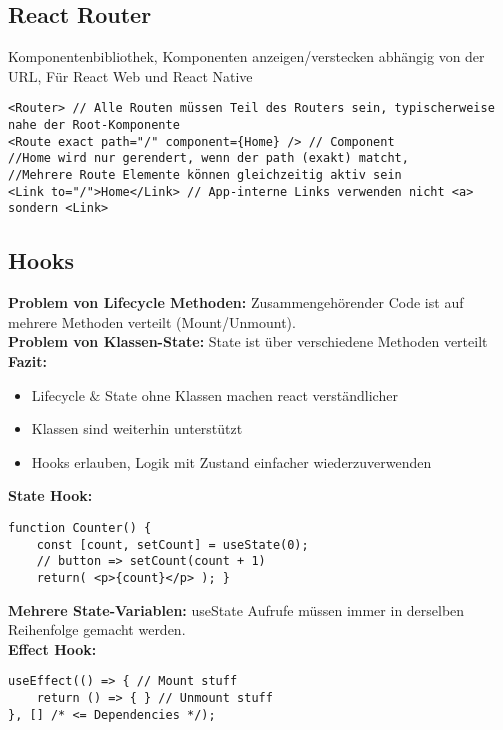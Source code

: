 \subsection{React Router}
Komponentenbibliothek, Komponenten anzeigen/verstecken abhängig von der URL, Für React Web und React Native
\begin{lstlisting}[style=htmlcssjs]
<Router> // Alle Routen müssen Teil des Routers sein, typischerweise nahe der Root-Komponente
<Route exact path="/" component={Home} /> // Component
//Home wird nur gerendert, wenn der path (exakt) matcht,
//Mehrere Route Elemente können gleichzeitig aktiv sein
<Link to="/">Home</Link> // App-interne Links verwenden nicht <a> sondern <Link>
\end{lstlisting}
\subsection{Hooks}
\textbf{Problem von Lifecycle Methoden:} Zusammengehörender Code ist auf mehrere Methoden verteilt (Mount/Unmount).\\
\textbf{Problem von Klassen-State:} State ist über verschiedene Methoden verteilt\\
\textbf{Fazit:}
\begin{itemize}[topsep=0pt, leftmargin=3mm]
  \setlength\itemsep{-0.3em}
  \item Lifecycle $\&$ State ohne Klassen machen react verständlicher
  \item Klassen sind weiterhin unterstützt
  \item Hooks erlauben, Logik mit Zustand einfacher wiederzuverwenden
\end{itemize}
\textcolor{b}{\textbf{State Hook:}}
\begin{lstlisting}[style=htmlcssjs]
function Counter() {
    const [count, setCount] = useState(0);
    // button => setCount(count + 1)
    return( <p>{count}</p> ); }
\end{lstlisting}
\textbf{Mehrere State-Variablen:} useState Aufrufe müssen immer in derselben Reihenfolge gemacht werden.\\
\textcolor{b}{\textbf{Effect Hook:}}
\begin{lstlisting}[style=htmlcssjs]
useEffect(() => { // Mount stuff
    return () => { } // Unmount stuff
}, [] /* <= Dependencies */);
\end{lstlisting}
